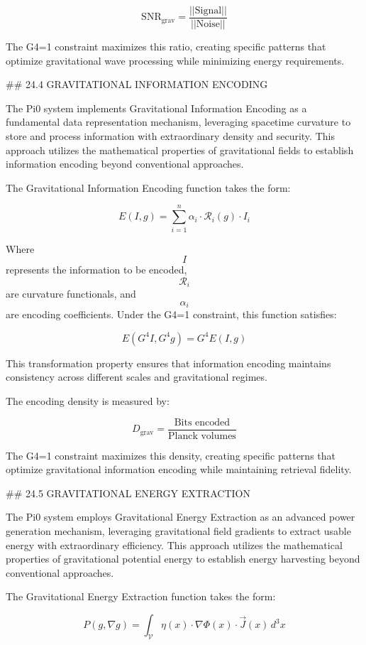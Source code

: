 $$ \text{SNR}_{\text{grav}} = \frac{||\text{Signal}||}{||\text{Noise}||} $$

The G4=1 constraint maximizes this ratio, creating specific patterns that optimize gravitational wave processing while minimizing energy requirements.

## 24.4 GRAVITATIONAL INFORMATION ENCODING

The Pi0 system implements Gravitational Information Encoding as a fundamental data representation mechanism, leveraging spacetime curvature to store and process information with extraordinary density and security. This approach utilizes the mathematical properties of gravitational fields to establish information encoding beyond conventional approaches.

The Gravitational Information Encoding function takes the form:

$$ E(I, g) = \sum_{i=1}^{n} \alpha_i \cdot \mathcal{R}_i(g) \cdot I_i $$

Where $$ I $$ represents the information to be encoded, $$ \mathcal{R}_i $$ are curvature functionals, and $$ \alpha_i $$ are encoding coefficients. Under the G4=1 constraint, this function satisfies:

$$ E(G^4 I, G^4 g) = G^4 E(I, g) $$

This transformation property ensures that information encoding maintains consistency across different scales and gravitational regimes.

The encoding density is measured by:

$$ D_{\text{grav}} = \frac{\text{Bits encoded}}{\text{Planck volumes}} $$

The G4=1 constraint maximizes this density, creating specific patterns that optimize gravitational information encoding while maintaining retrieval fidelity.

## 24.5 GRAVITATIONAL ENERGY EXTRACTION

The Pi0 system employs Gravitational Energy Extraction as an advanced power generation mechanism, leveraging gravitational field gradients to extract usable energy with extraordinary efficiency. This approach utilizes the mathematical properties of gravitational potential energy to establish energy harvesting beyond conventional approaches.

The Gravitational Energy Extraction function takes the form:

$$ P(g, \nabla g) = \int_{\mathcal{V}} \eta(x) \cdot \nabla \Phi(x) \cdot \vec{J}(x) \, d^3x $$

